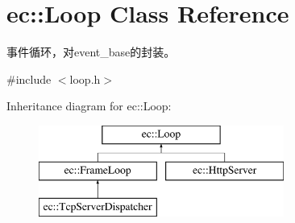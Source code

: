 \hypertarget{classec_1_1Loop}{\section{ec\-:\-:Loop Class Reference}
\label{classec_1_1Loop}
}


事件循环，对event\-\_\-base的封装。  




{\ttfamily \#include $<$loop.\-h$>$}

Inheritance diagram for ec\-:\-:Loop\-:\begin{figure}[H]
\begin{center}
\leavevmode
\includegraphics[height=3.000000cm]{classec_1_1Loop}
\end{center}
\end{figure}
